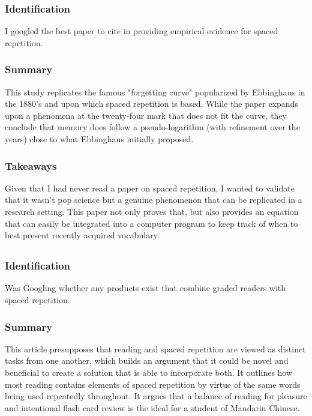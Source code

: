 \documentclass[
	letterpaper, %
]{jdf}
\begin{document}
\subsubsection{Identification}
I googled the best paper to cite in providing empirical evidence for spaced repetition.

\subsubsection{Summary}
This study replicates the famous "forgetting curve" popularized by Ebbinghaus in the 1880's and upon which spaced repetition is based. While the paper expands upon a phenomena at the twenty-four mark that does not fit the curve, they conclude that memory does follow a pseudo-logarithm (with refinement over the years) close to what Ebbinghaus initially proposed.

\subsubsection{Takeaways}
Given that I had never read a paper on spaced repetition, I wanted to validate that it wasn't pop science but a genuine phenomenon that can be replicated in a research setting. This paper not only proves that, but also provides an equation that can easily be integrated into a computer program to keep track of when to best present recently acquired vocabulary.

\subsection{}
\subsubsection{Identification}
Was Googling whether any products exist that combine graded readers with spaced repetition.

\subsubsection{Summary}
This article presupposes that reading and spaced repetition are viewed as distinct tasks from one another, which builds an argument that it could be novel and beneficial to create a solution that is able to incorporate both. It outlines how most reading contains elements of spaced repetition by virtue of the same words being used repeatedly throughout. It argues that a balance of reading for pleasure and intentional flash card review is the ideal for a student of Mandarin Chinese.
\end{document}
